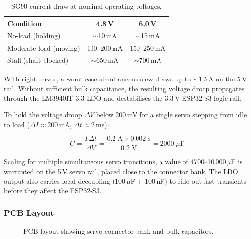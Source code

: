 \documentclass[12pt]{article}
\begin{document}
\begin{table}[H]
  \centering
  \caption{SG90 current draw at nominal operating voltages.}
  \label{tab:sg90_current}
  \begin{tabular}{lcc}
    \toprule
    Condition & 4.8\,V & 6.0\,V \\
    \midrule
    No-load (holding) & $\sim$10\,mA & $\sim$15\,mA \\
    Moderate load (moving) & 100--200\,mA & 150--250\,mA \\
    Stall (shaft blocked) & $\sim$650\,mA & $\sim$700\,mA \\
    \bottomrule
  \end{tabular}
\end{table}

With eight servos, a worst-case simultaneous slew draws up to $\sim$1.5\,A on
the 5\,V rail.  Without sufficient bulk capacitance, the resulting voltage droop
propagates through the LM3940IT-3.3 LDO and destabilises the 3.3\,V ESP32-S3
logic rail.

To hold the voltage droop $\Delta V$ below 200\,mV for a single servo stepping
from idle to load ($\Delta I \approx 200$\,mA, $\Delta t \approx 2$\,ms):

\begin{equation}
  C = \frac{I \,\Delta t}{\Delta V}
    = \frac{0.2\;\text{A} \times 0.002\;\text{s}}{0.2\;\text{V}}
    = 2000\;\mu\text{F}
  \label{eq:bulk_cap}
\end{equation}

Scaling for multiple simultaneous servo transitions, a value of 4700--10\,000\,$\mu$F
is warranted on the 5\,V servo rail, placed close to the connector bank.  The
LDO output also carries local decoupling (100\,$\mu$F + 100\,nF) to ride out
fast transients before they affect the ESP32-S3.

\subsubsection{PCB Layout}

\begin{figure}[H]
  \centering
  \caption{PCB layout showing servo connector bank and bulk capacitors.}
  \label{fig:pcb_layout}
\end{figure}
\end{document}

